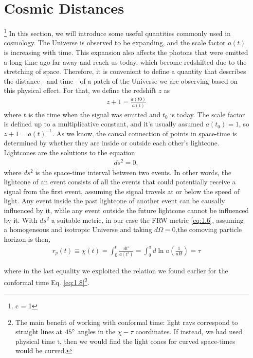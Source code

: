 \section{Cosmic Distances}\footnote{c = 1} 
In this section, we will introduce some useful quantities commonly used in cosmology. The Universe is observed to be expanding, and the scale factor $a(t)$ is increasing with time. This expansion also affects the photons that were emitted a long time ago far away and reach us today, which become redshifted due to the stretching of space. Therefore, it is convenient to define a quantity that describes the distance - and time - of a patch of the Universe we are observing based on this physical effect. For that, we define the redshift $z$ as
\begin{align}
    z+1 = \frac{a(t0)}{a(t)}
\end{align}
where $t$ is the time when the signal was emitted and $t_0$ is today. The scale factor is defined up to a multiplicative constant, and it's usually assumed $a(t_0) = 1$, so $z + 1 = a(t)^{-1}$.
As we know, the causal connection of points in space-time is determined by whether they are inside or outside each other's lightcone. Lightcones are the solutions to the equation
\begin{align}
ds^2 = 0,
\end{align}
where $ds^2$ is the space-time interval between two events. In other words, the lightcone of an event consists of all the events that could potentially receive a signal from the first event, assuming the signal travels at or below the speed of light. Any event inside the past lightcone of another event can be causally influenced by it, while any event outside the future lightcone cannot be influenced by it.
With $ds^2$ a suitable metric, in our case the FRW metric \ref{eq:1.6}, assuming a homogeneous and isotropic Universe and taking $d\Omega=0$,the comoving particle horizon is then, 
\begin{align}
    r_p(t) \equiv \chi(t) = \int_0^t \frac{ dt'}{a(t')} =  \int_0^a d\ln{a}\left(\frac{1}{aH}\right) = \tau \label{eq:1.28}
\end{align}

where in the last equality we exploited the relation we found earlier for the conformal time  Eq. \ref{eq:1.8}\footnote{The main benefit of working with conformal time: light rays correspond to straight lines at $45 \degree$ angles in the $\chi - \tau$ coordinates. If instead, we had used physical time t, then we would find the light cones for curved space-times would be curved.}.

